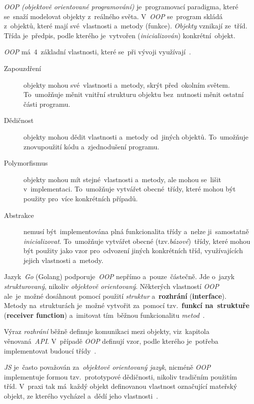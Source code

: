 \documentclass[11pt,a4paper]{report}
\let\oldacrshort\acrshort
\renewcommand{\acrshort}[1]{\emph{\normalsize\color[rgb]{0,0,0}\noindent\oldacrshort{#1}}}
\begin{document}
            \emph{OOP (objektově orientované programování)} je~programovací paradigma, které se~snaží modelovat objekty z~reálného světa. V~\emph{OOP} se~program skládá z~objektů, které mají své~vlastnosti a~metody (funkce). \emph{Objekty} vznikají ze~tříd. Třída je~předpis, podle kterého je~vytvořen (\emph{inicializován}) konkrétní~objekt.
            
            \emph{OOP} má~4~základní vlastnosti, které se~při vývoji využívají~\cite{Keogh:OOP}.
            \begin{description}
                \item[Zapouzdření] objekty mohou své~vlastnosti a~metody, skrýt před~okolním světem. To~umožňuje měnit vnitřní strukturu objektu bez~nutnosti měnit ostatní části programu.
                \item[Dědičnost] objekty mohou dědit vlastnosti a~metody od~jiných objektů. To~umožňuje znovupoužití kódu a~zjednodušení programu.
                \item[Polymorfismus] objekty mohou mít stejné~vlastnosti a~metody, ale mohou se~lišit v~implementaci. To~umožňuje vytvářet obecné~třídy, které mohou být použity pro~více konkrétních případů.
                \item[Abstrakce] nemusí být~implementována plná funkcionalita třídy a~nelze ji~samostatně \emph{inicializovat}. To~umožňuje vytvářet obecné (tzv.\emph{bázové})~třídy, které mohou být použity jako vzor pro~odvození jiných konkrétních tříd, využívajících jejich vlastnosti a~metody.
            \end{description}

            Jazyk~\emph{Go} (Golang) podporuje~\emph{OOP} nepřímo a~pouze~částečně. Jde o~jazyk \emph{strukturovaný}, nikoliv \emph{objektově orientovaný}. Některých vlastností \emph{OOP} ale~je~možné dosáhnout pomocí použití \emph{struktur} a~\textbf{rozhrání} (\textbf{interface}). Metody na~strukturách je~možné vytvořit za~pomocí tzv.~\textbf{funkcí na~struktuře} (\textbf{receiver function}) a~imitovat tím~běžnou funkcionalitu \emph{metod}~\cite{go:OOP, Scott2019:programmingpragmatics}.

            Výraz \emph{rozhrání} běžně definuje komunikaci mezi objekty, viz~kapitola věnovaná~\acrshort{API}. V~případě \emph{OOP} definují vzor, podle kterého je~potřeba implementovat budoucí třídy~\cite{go:OOP}.
            
            \acrshort{JS} je~často považován za~\emph{objektově orientovaný jazyk}, nicméně \emph{OOP} implementuje formou tzv.~prototypové dědičnosti, nikoliv tradičním použitím tříd. V~praxi tak má~každý objekt definovanou vlastnost označující mateřský objekt, ze kterého vycházel a~dědí jeho vlastnosti~\cite[2.1.01]{kantor_javascript, Scott2019:programmingpragmatics}.
            
\end{document}
